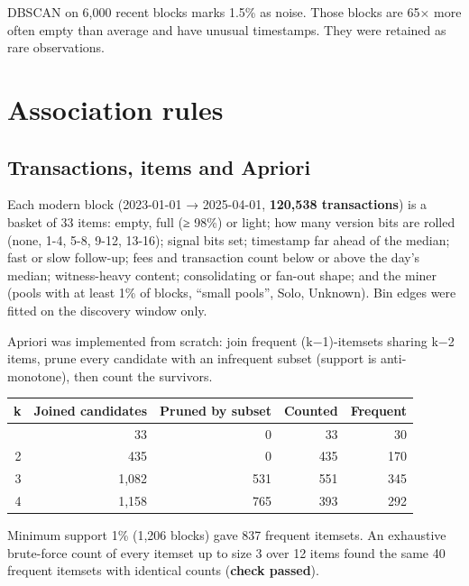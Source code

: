 \documentclass[
  11pt,
  a4paper,
]{article}
\newenvironment{reporttable}{\par\small\sffamily}{\par}
\begin{document}
DBSCAN on 6,000 recent blocks marks 1.5\% as noise. Those blocks are 65×
more often empty than average and have unusual timestamps. They were
retained as rare observations.


\section{Association rules}\label{association-rules}

\subsection{Transactions, items and
Apriori}\label{transactions-items-and-apriori}

Each modern block (2023-01-01 → 2025-04-01, \textbf{120,538
transactions}) is a basket of 33 items: empty, full (≥ 98\%) or light;
how many version bits are rolled (none, 1-4, 5-8, 9-12, 13-16); signal
bits set; timestamp far ahead of the median; fast or slow follow-up;
fees and transaction count below or above the day's median;
witness-heavy content; consolidating or fan-out shape; and the miner
(pools with at least 1\% of blocks, ``small pools'', Solo, Unknown). Bin
edges were fitted on the discovery window only.

Apriori was implemented from scratch: join frequent (k−1)-itemsets
sharing k−2 items, prune every candidate with an infrequent subset
(support is anti-monotone), then count the survivors.

\begin{reporttable}

\begin{longtable}[]{@{}rrrrr@{}}
\toprule\noalign{}
\textbf{k} & \textbf{Joined candidates} & \textbf{Pruned by subset} &
\textbf{Counted} & \textbf{Frequent} \\
\midrule\noalign{}
\endhead
\bottomrule\noalign{}
\endlastfoot
1 & 33 & 0 & 33 & 30 \\
2 & 435 & 0 & 435 & 170 \\
3 & 1,082 & 531 & 551 & 345 \\
4 & 1,158 & 765 & 393 & 292 \\
\end{longtable}

\end{reporttable}

Minimum support 1\% (1,206 blocks) gave 837 frequent itemsets. An
exhaustive brute-force count of every itemset up to size 3 over 12 items
found the same 40 frequent itemsets with identical counts (\textbf{check
passed}).
\end{document}
